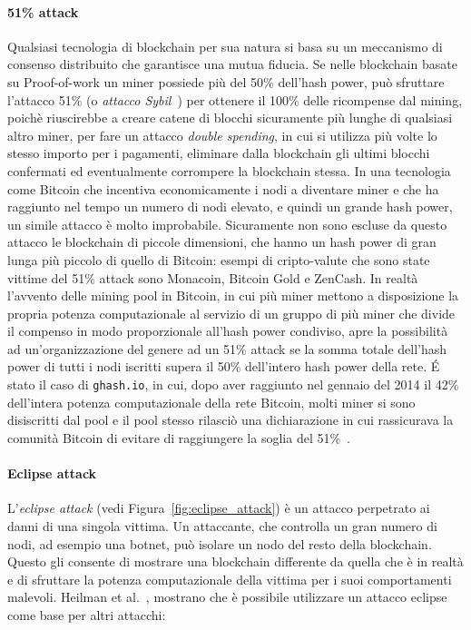\paragraph{51\% attack}
Qualsiasi tecnologia di blockchain per sua natura si basa su un meccanismo di consenso distribuito che garantisce una mutua fiducia. Se nelle blockchain basate su Proof-of-work un miner possiede più del 50\% dell'hash power,
può sfruttare l'attacco 51\% (o \emph{attacco Sybil}~\cite{douceur2002sybil}) per ottenere il 100\% delle ricompense dal mining, poichè riuscirebbe a creare catene di blocchi sicuramente più lunghe di qualsiasi altro miner, per fare un attacco \emph{double spending}, in cui si utilizza più volte lo stesso importo per i pagamenti, eliminare dalla blockchain gli ultimi blocchi confermati ed eventualmente corrompere la blockchain stessa.
In una tecnologia come Bitcoin che incentiva economicamente i nodi a diventare miner e che ha raggiunto nel tempo un numero di nodi elevato, e quindi un grande hash power, un simile attacco è molto improbabile. Sicuramente non sono escluse da questo attacco le blockchain di piccole dimensioni, che hanno un hash power di gran lunga più piccolo di quello di Bitcoin: esempi di cripto-valute che sono state vittime del 51\% attack sono Monacoin, Bitcoin Gold e ZenCash. 
In realtà l'avvento delle mining pool in Bitcoin, in cui più miner mettono a disposizione la propria potenza computazionale al servizio di un gruppo di più miner che divide il compenso in modo proporzionale all'hash power condiviso, apre la possibilità ad un'organizzazione del genere ad un 51\% attack se la somma totale dell'hash power di tutti i nodi iscritti supera il 50\% dell'intero hash power della rete. \'E stato il caso di \texttt{ghash.io}, in cui, dopo aver raggiunto nel gennaio del 2014 il 42\% dell'intera potenza computazionale della rete Bitcoin, molti miner si sono disiscritti dal pool e il pool stesso rilasciò una dichiarazione in cui rassicurava la comunità Bitcoin di evitare di raggiungere la soglia del 51\%~\cite{51-attack}.

\paragraph{Eclipse attack}
L'\emph{eclipse attack} (vedi Figura~\ref{fig:eclipse_attack}) è un attacco perpetrato ai danni di una singola vittima. Un attaccante, che controlla un gran numero di nodi, ad esempio una botnet, può isolare un nodo del resto della blockchain. Questo gli consente di mostrare una blockchain differente da quella che è in realtà e di sfruttare la potenza computazionale della vittima per i suoi comportamenti malevoli. Heilman et al.~\cite{heilman2015eclipse}, mostrano che è possibile utilizzare un attacco eclipse come base per altri attacchi:

